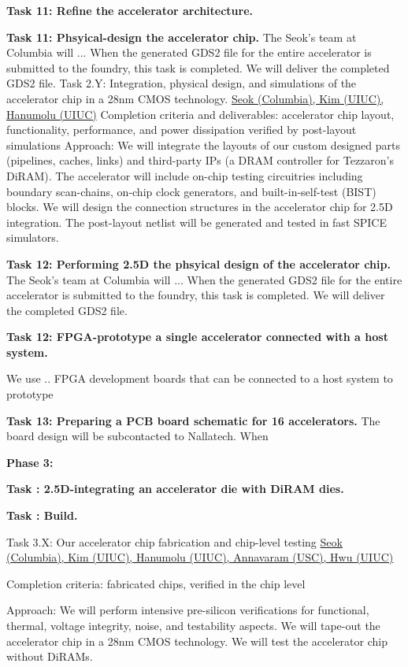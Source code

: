 \textbf{Task 11: Refine the accelerator architecture.} 


\noindent
\textbf{Task 11: Phsyical-design the accelerator chip.} 
The Seok's team at Columbia will ...
When the generated GDS2 file for the entire accelerator is submitted to the foundry, this task is completed.
We will deliver the completed GDS2 file.
Task 2.Y: Integration, physical design, and simulations of the accelerator chip in a 28nm CMOS technology. \underline{Seok (Columbia), Kim (UIUC), Hanumolu (UIUC)}
Completion criteria and deliverables: accelerator chip layout, functionality, performance, and power dissipation verified by post-layout simulations
Approach: We will integrate the layouts of our custom designed parts (pipelines, caches, links) and third-party IPs (a DRAM controller for Tezzaron's DiRAM). The accelerator will include on-chip testing circuitries including boundary scan-chains, on-chip clock generators, and built-in-self-test (BIST) blocks. We will design the connection structures in the accelerator chip for 2.5D integration. The post-layout netlist will be generated and tested in fast SPICE simulators. 


\noindent
\textbf{Task 12: Performing 2.5D the phsyical design of the accelerator chip.} 
The Seok's team at Columbia will ...
When the generated GDS2 file for the entire accelerator is submitted to the foundry, this task is completed.
We will deliver the completed GDS2 file.


\noindent
\textbf{Task 12: FPGA-prototype a single accelerator connected with a host system.}

We use .. FPGA development boards that can be connected to a host system to prototype

\noindent
\textbf{Task 13: Preparing a PCB board schematic for 16 accelerators.}
The board design will be subcontacted to Nallatech.
When 


\noindent
\textbf{Phase 3:}

\noindent
\textbf{Task : 2.5D-integrating an accelerator die with DiRAM dies.}

\noindent
\textbf{Task : Build.}



Task 3.X: Our accelerator chip fabrication and chip-level testing \underline{Seok (Columbia), Kim (UIUC), Hanumolu (UIUC), Annavaram (USC), Hwu (UIUC)}

   Completion criteria: fabricated chips, verified in the chip level

   Approach: We will perform intensive pre-silicon verifications for functional, thermal, voltage integrity, noise, and testability aspects. We will tape-out the accelerator chip in a 28nm CMOS technology. We will test the accelerator chip without DiRAMs. 


